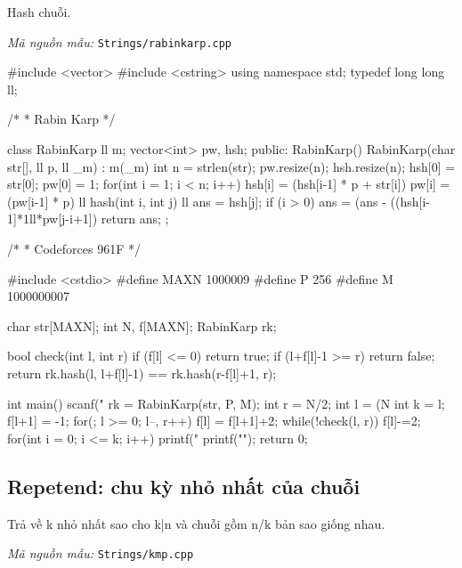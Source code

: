 \documentclass[11pt]{article}
\newcommand{\codepath}[1]{\par\noindent\textit{Mã nguồn mẫu:} \texttt{#1}\par}
\begin{document}
Hash chuỗi.

\codepath{Strings/rabinkarp.cpp}

\begingroup\scriptsize
\begin{vncode}
#include <vector>
#include <cstring>
using namespace std;
typedef long long ll;

/*
 * Rabin Karp
 */

class RabinKarp {
	ll m;
	vector<int> pw, hsh;
public:
	RabinKarp() {}
	RabinKarp(char str[], ll p, ll _m) : m(_m) {
		int n = strlen(str);
		pw.resize(n); hsh.resize(n);
		hsh[0] = str[0]; pw[0] = 1;
		for(int i = 1; i < n; i++) {
			hsh[i] = (hsh[i-1] * p + str[i]) %
			pw[i] = (pw[i-1] * p) %
		}
	}
	ll hash(int i, int j) {
		ll ans = hsh[j];
		if (i > 0) ans = (ans - ((hsh[i-1]*1ll*pw[j-i+1])%
		return ans;
	}
};

/*
 * Codeforces 961F
 */

#include <cstdio>
#define MAXN 1000009
#define P 256
#define M 1000000007

char str[MAXN];
int N, f[MAXN];
RabinKarp rk;

bool check(int l, int r) {
	if (f[l] <= 0) return true;
	if (l+f[l]-1 >= r) return false;
	return rk.hash(l, l+f[l]-1) == rk.hash(r-f[l]+1, r);
}

int main() {
	scanf("%
	rk = RabinKarp(str, P, M);
	int r = N/2;
	int l = (N %
	int k = l;
	f[l+1] = -1;
	for(; l >= 0; l--, r++) {
		f[l] = f[l+1]+2;
		while(!check(l, r)) f[l]-=2;
	}
	for(int i = 0; i <= k; i++) printf("%
	printf("\n");
	return 0;
}
\end{vncode}
\endgroup


\subsection{Repetend: chu kỳ nhỏ nhất của chuỗi}

Trả về k nhỏ nhất sao cho k|n và chuỗi gồm n/k bản sao giống nhau.

\codepath{Strings/kmp.cpp}
\end{document}
